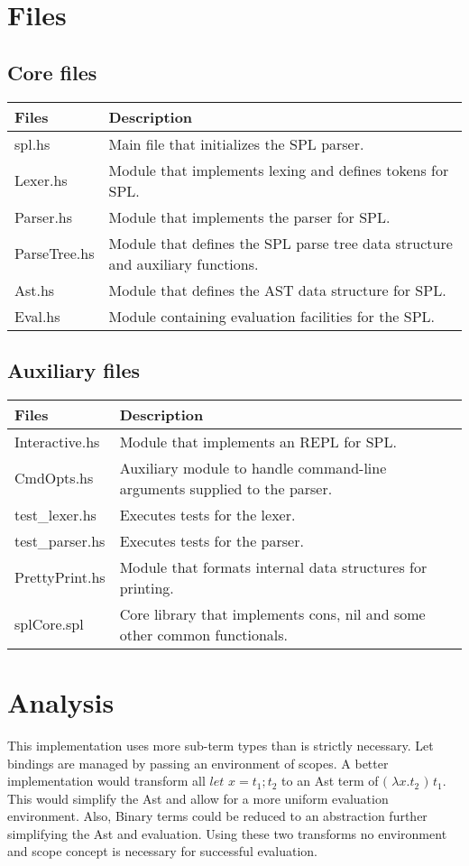 \documentclass{article}
\begin{document}
\section{Files}
\subsection{Core files}
\begin{tabular}{|l|l|}
  \hline
{\bf Files}&{\bf Description}\\
  \hline
spl.hs & Main file that initializes the SPL parser.\\
  \hline
Lexer.hs & Module that implements lexing and defines tokens for SPL.\\
  \hline
Parser.hs & Module that implements the parser for SPL.\\
  \hline
ParseTree.hs & Module that defines the SPL parse tree data structure and 
auxiliary functions.\\
  \hline
Ast.hs & Module that defines the AST data structure for SPL.\\
  \hline
Eval.hs & Module containing evaluation facilities for the SPL.\\
  \hline
\end{tabular}
\subsection{Auxiliary files}
\begin{tabular}{|l|l|}
  \hline
{\bf Files}&{\bf Description}\\
  \hline
Interactive.hs & Module that implements an REPL for SPL.\\
  \hline
CmdOpts.hs & Auxiliary module to handle command-line arguments supplied to the 
parser.\\
  \hline
test_lexer.hs & Executes tests for the lexer.\\
  \hline
test_parser.hs & Executes tests for the parser.\\
  \hline
PrettyPrint.hs & Module that formats internal data structures for printing.\\
  \hline
splCore.spl & Core library that implements cons, nil and some other common 
functionals.\\
  \hline
\end{tabular}

\section{Analysis}
This implementation uses more sub-term types than is strictly necessary. Let 
bindings are managed by passing an environment of scopes. A better 
implementation would transform all $let$ $x = t_1 ; t_2$ to an Ast term of 
$($ $\lambda x.t_2$ $)$ $t_1$. This would simplify the Ast and allow for a more
uniform evaluation environment. Also, Binary terms could be reduced to an
abstraction further simplifying the Ast and evaluation. Using these two 
transforms no environment and scope concept is necessary for successful 
evaluation.
\end{document}
